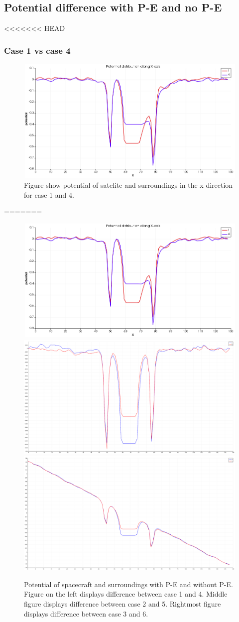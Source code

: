 \subsection{Potential difference with P-E and no P-E}

<<<<<<< HEAD

\subsubsection{Case 1 vs case 4}

\begin{figure}
    \includegraphics[scale = 0.5 \textwidth]{potential_case1&4.png}
    \caption{Figure show potential of satelite and surroundings in the x-direction for case 1 and 4.}
\end{figure}

=======
    \begin{figure}
        \includegraphics[width = 0.3 \textwidth]{images/pot_case14.png}
        \includegraphics[width = 0.3 \textwidth]{images/pot_case25.png}
        \includegraphics[width = 0.3 \textwidth]{images/pot_case36.png}
        \caption{Potential of spacecraft and surroundings with P-E and without P-E.
		Figure on the left displays difference between case 1 and 4. Middle figure
		displays difference between case 2 and 5. Rightmost figure displays difference between case 3 and 6.}
    \end{figure}


